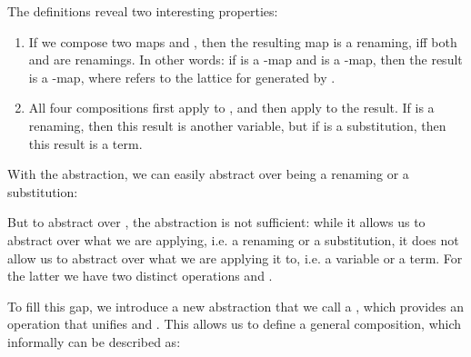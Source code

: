 \documentclass[a4paper, UKenglish, cleveref, autoref, thm-restate]{lipics-v2021}
\newenvironment{ExampleCode*}{%
  \begin{tcolorbox}[%
    colframe=white,%
    colback=yellow!5,%
    boxrule=0.0pt,%
    top=2.5pt,%
    left=2.5pt,%
    bottom=2.5pt,%
    right=2.5pt,%
    before skip=5pt,%
    after skip=5pt,%
    boxsep=0pt%
  ]\vspace{-0.2\baselineskip}%
}{%
  \vspace{-1\baselineskip}%
  \end{tcolorbox}%
}
\newcommand*\ExampleCode[1]{\begin{ExampleCode*}{#1}\end{ExampleCode*}}
\newcommand*\ACode[1]{\AgdaFontStyle{\textcolor{mygray}{#1}}}
\newcommand*\AField[1]{\AgdaField{#1}}
\newcommand*\ACon[1]{\AgdaInductiveConstructor{#1}}
\newcommand*\ADef[1]{\AgdaFunction{#1}}
\begin{document}
  \noindent
  \begin{minipage}[t]{0.65\linewidth}
  \ExampleCode\KExFourCompsI
  \end{minipage}
  \begin{minipage}[t]{0.35\linewidth}
  \ExampleCode\KExFourCompsII
  \end{minipage}

  The definitions reveal two interesting properties:
  \begin{enumerate}
  \item
    If we compose two maps \ACode{ϕ₁} and \ACode{ϕ₂}, then the
    resulting map is a renaming, iff both \ACode{ϕ₁} and \ACode{ϕ₂} are
    renamings.
    In other words:
    if \ACode{ϕ₁} is a \ACode{K₁}-map and \ACode{ϕ₂} is a \ACode{K₂}-map,
    then the result is a \ACode{(K₁ ⊔ K₂)}-map, where \ACode{⊔} refers to the
    lattice for \ACode{\{ \ADef{Kᵣ} , \ADef{Kₛ} \}}
    generated by \ACode{\ADef{Kᵣ} < \ADef{Kₛ}}.
  \item
    All four compositions first apply \ACode{ϕ₁} to \ACode{x},
    and then apply \ACode{ϕ₂} to the result.
    If \ACode{ϕ₁} is a renaming, then this result is another variable, but
    if \ACode{ϕ₁} is a substitution, then this result is a term.
  \end{enumerate}
  With the \ACode{\ACon{Kit}} abstraction, we can easily abstract over
  \ACode{ϕ₂} being a renaming or a substitution:

  \noindent
  \begin{minipage}[t]{0.65\linewidth}
  \ExampleCode\KExTwoCompsI
  \end{minipage}
  \begin{minipage}[t]{0.35\linewidth}
  \ExampleCode\KExTwoCompsII
  \end{minipage}

  But to abstract over \ACode{ϕ₁}, the \ACode{\ACon{Kit}} abstraction
  is not sufficient: while it allows us to abstract over what we are applying, i.e.
  a renaming or a substitution, it does not allow us to
  abstract over what we are applying it to, i.e. a variable or a term.
  For the latter we have two distinct operations \ACode{\ADef{\_\&\_}}
  and \ACode{\ADef{\_⋯\_}}.

  To fill this gap, we introduce a new abstraction that we call a
  \ACode{\ACon{CKit}},
  which provides an operation \ACode{\AField{\_\&/⋯\_}} that unifies
  \ACode{\ADef{\_\&\_}} and \ACode{\ADef{\_⋯\_}}. This allows us to
  define a general composition, which informally can be described as:
  \ExampleCode\KComposition
\end{document}

